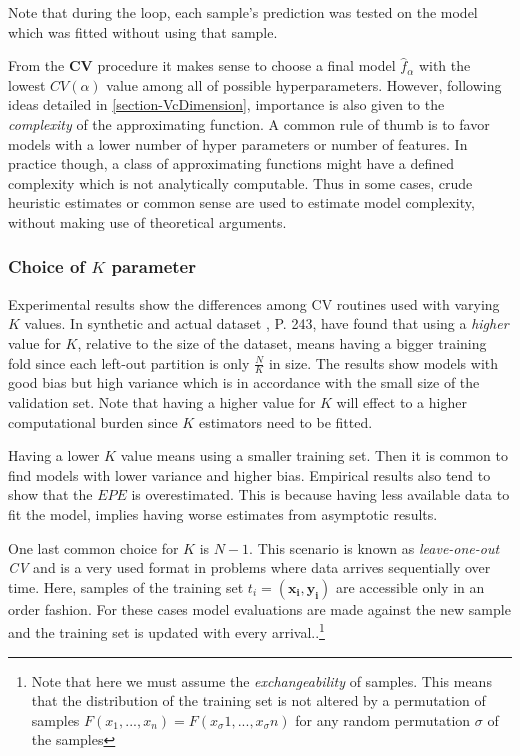 Note that during the loop, each sample's prediction was tested on the model which was fitted without using that sample.

From the \textbf{CV} procedure it makes sense to choose a final  model $\hat{f}_\alpha$ with the lowest $CV(\alpha)$ value among all of possible hyperparameters. However, following ideas detailed in \ref{section-VcDimension}, importance is also given to the \textit{complexity} of the approximating function. A common rule of thumb is to favor models with a lower number of hyper parameters or number of features. In practice though, a class of approximating functions might have a defined complexity which is not analytically computable. Thus in some cases, crude heuristic estimates or common sense are used to estimate model complexity, without making use of theoretical arguments.

\subsubsection{Choice of $K$ parameter}

Experimental results show the differences among CV routines used with varying $K$ values. In synthetic and actual dataset , \textcite{hastie-elemstatslearn} P. 243, have found that using a \textit{higher} value for $K$, relative to the size of the dataset, means having a bigger training fold since each left-out partition is only $\frac{N}{K}$ in size. The results show models with good bias but high variance which is in accordance with the small size of the validation set. Note that having a higher value for $K$ will effect to a higher computational burden since $K$ estimators need to be fitted.

Having a lower $K$ value means using a smaller training set. Then it is common to find models with lower variance and higher bias. Empirical results also tend to show that the $EPE$ is overestimated. This is because having less available data to fit the model, implies having worse estimates from asymptotic results.

One last common choice for $K$ is $N-1$. This scenario is known as \textit{leave-one-out CV} and is a very used format in problems where data arrives sequentially over time. Here, samples of the training set $t_i = ( \boldsymbol{x_i} , \boldsymbol{y_i} )$ are accessible only in an order fashion. For these cases model evaluations are made against the new sample and the training set is updated with every arrival..\footnote{Note that here we must assume the \textit{exchangeability} of samples. This means that the distribution of the training set is not altered by a permutation of samples $F(x_1,...,x_n ) = F(x_\sigma{1},...,x_\sigma{n})$ for any random permutation $\sigma$ of the samples  }


